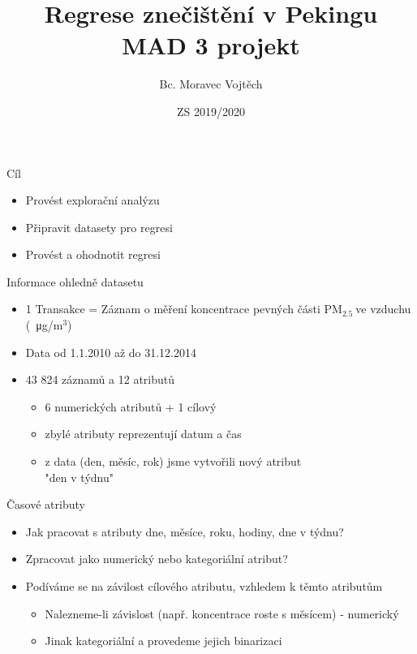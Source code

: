 \documentclass{beamer}%
\author{Bc. Moravec Vojtěch}
\title{Regrese znečištění v Pekingu \\ MAD 3 projekt}
\date{ZS 2019/2020}
\institute{Vysoká škola báňská – Technická univerzita Ostrava}
\newcommand{\pmQuant}[0]{$\text{PM}_{2.5}\:$}
\begin{document}
\maketitle
\begin{frame}{Cíl}
    \begin{itemize}
        \item Provést explorační analýzu
        \item Připravit datasety pro regresi
        \item Provést a ohodnotit regresi
    \end{itemize}
\end{frame}
\begin{frame}{Informace ohledně datasetu}
    \begin{itemize}
        \item 1 Transakce = Záznam o měření koncentrace pevných části \pmQuant ve vzduchu (\SI{}{\micro\gram}/$\text{m}^3$)
        \item Data od 1.1.2010 až do 31.12.2014
        \item 43 824 záznamů a 12 atributů
        \begin{itemize}
            \item 6 numerických atributů + 1 cílový
            \item zbylé atributy reprezentují datum a čas
            \item z data (den, měsíc, rok) jsme vytvořili nový atribut \\ "den v týdnu"
        \end{itemize}
    \end{itemize}
\end{frame}
\begin{frame}{Časové atributy}
    \begin{itemize}
        \item Jak pracovat s atributy dne, měsíce, roku, hodiny, dne v týdnu?
        \item Zpracovat jako numerický nebo kategoriální atribut?
        \item Podíváme se na závilost cílového atributu, vzhledem k těmto atributům
        \begin{itemize}
            \item Nalezneme-li závislost (např. koncentrace roste s měsícem) - numerický
            \item Jinak kategoriální a provedeme jejich binarizaci
        \end{itemize}
    \end{itemize}
\end{frame}
\end{document}
